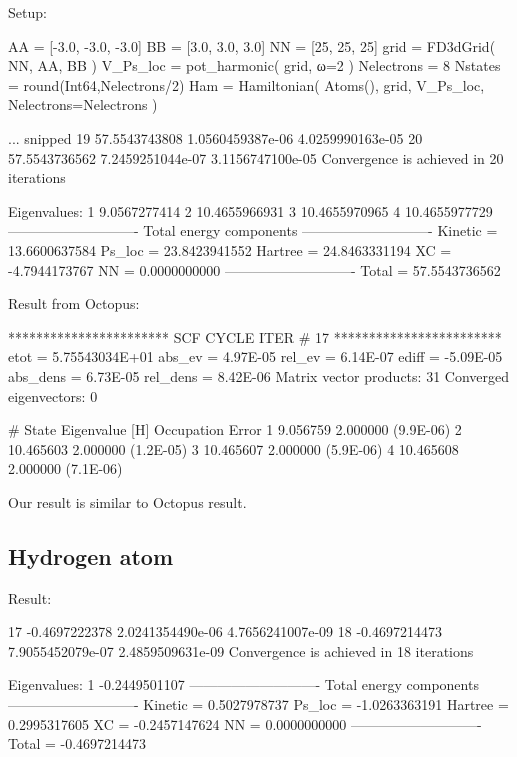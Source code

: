 Setup:
\begin{juliacode}
AA = [-3.0, -3.0, -3.0]
BB = [3.0, 3.0, 3.0]
NN = [25, 25, 25]
grid = FD3dGrid( NN, AA, BB )
V_Ps_loc = pot_harmonic( grid, ω=2 )
Nelectrons = 8
Nstates = round(Int64,Nelectrons/2)
Ham = Hamiltonian( Atoms(), grid, V_Ps_loc, Nelectrons=Nelectrons )
\end{juliacode}

\begin{textcode}
... snipped
  19      57.5543743808   1.0560459387e-06   4.0259990163e-05
  20      57.5543736562   7.2459251044e-07   3.1156747100e-05
Convergence is achieved in 20 iterations

Eigenvalues:
 1       9.0567277414
 2      10.4655966931
 3      10.4655970965
 4      10.4655977729
----------------------------
Total energy components
----------------------------
Kinetic =      13.6600637584
Ps_loc  =      23.8423941552
Hartree =      24.8463331194
XC      =      -4.7944173767
NN      =       0.0000000000
----------------------------
Total   =      57.5543736562
\end{textcode}


Result from Octopus:
\begin{textcode}
*********************** SCF CYCLE ITER #   17 ************************
 etot  =  5.75543034E+01 abs_ev   =  4.97E-05 rel_ev   =  6.14E-07
 ediff =       -5.09E-05 abs_dens =  6.73E-05 rel_dens =  8.42E-06
Matrix vector products:     31
Converged eigenvectors:      0

#  State  Eigenvalue [H]  Occupation    Error
      1        9.056759    2.000000   (9.9E-06)
      2       10.465603    2.000000   (1.2E-05)
      3       10.465607    2.000000   (5.9E-06)
      4       10.465608    2.000000   (7.1E-06) 
\end{textcode}

Our result is similar to Octopus result.


\subsection{Hydrogen atom}

Result:
\begin{textcode}
  17      -0.4697222378   2.0241354490e-06   4.7656241007e-09
  18      -0.4697214473   7.9055452079e-07   2.4859509631e-09
Convergence is achieved in 18 iterations

Eigenvalues:
 1      -0.2449501107
----------------------------
Total energy components
----------------------------
Kinetic =       0.5027978737
Ps_loc  =      -1.0263363191
Hartree =       0.2995317605
XC      =      -0.2457147624
NN      =       0.0000000000
----------------------------
Total   =      -0.4697214473
\end{textcode}

